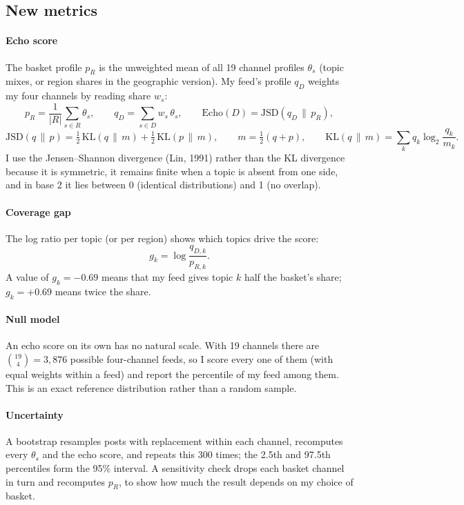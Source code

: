 \documentclass[11pt,a4paper]{article}
\newcommand{\JSD}{\mathrm{JSD}}
\newcommand{\KL}{\mathrm{KL}}
\newcommand{\Echo}{\mathrm{Echo}}
\begin{document}
\subsection{New metrics}
\label{sec:metrics}
\paragraph{Echo score} The basket profile $p_R$ is the unweighted mean of all 19 channel profiles $\theta_s$ (topic mixes, or region shares in the geographic version). My feed's profile $q_D$ weights my four channels by reading share $w_s$:
\begin{equation}
p_R = \frac{1}{|R|}\sum_{s\in R}\theta_s, \qquad q_D = \sum_{s\in D} w_s\,\theta_s, \qquad \Echo(D) = \JSD(q_D \,\|\, p_R),
\end{equation}
\begin{equation}
\JSD(q\,\|\,p) = \tfrac{1}{2}\,\KL(q\,\|\,m) + \tfrac{1}{2}\,\KL(p\,\|\,m), \qquad m = \tfrac{1}{2}(q+p), \qquad \KL(q\,\|\,m)=\sum_k q_k\log_2\frac{q_k}{m_k}.
\end{equation}
I use the Jensen--Shannon divergence (Lin, 1991) rather than the KL divergence because it is symmetric, it remains finite when a topic is absent from one side, and in base 2 it lies between 0 (identical distributions) and 1 (no overlap).

\paragraph{Coverage gap} The log ratio per topic (or per region) shows which topics drive the score:
\begin{equation}
g_k = \log\frac{q_{D,k}}{p_{R,k}} .
\end{equation}
A value of $g_k=-0.69$ means that my feed gives topic $k$ half the basket's share; $g_k=+0.69$ means twice the share.

\paragraph{Null model} An echo score on its own has no natural scale. With 19 channels there are $\binom{19}{4}=3{,}876$ possible four-channel feeds, so I score every one of them (with equal weights within a feed) and report the percentile of my feed among them. This is an exact reference distribution rather than a random sample.

\paragraph{Uncertainty} A bootstrap resamples posts with replacement within each channel, recomputes every $\theta_s$ and the echo score, and repeats this 300 times; the 2.5th and 97.5th percentiles form the 95\% interval. A sensitivity check drops each basket channel in turn and recomputes $p_R$, to show how much the result depends on my choice of basket.
\end{document}
